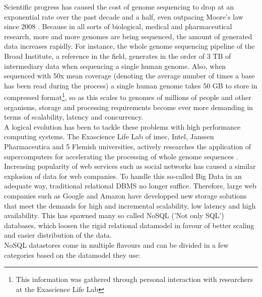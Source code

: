 \documentclass{IEEEtran}
\begin{document}
Scientific progress has caused the cost of genome sequencing to drop at an exponential rate over the past decade and a half, even outpacing Moore's law since 2008 \cite{wetterstrand_sequencing_cost}. Because in all sorts of biological, medical and pharmaceutical research, more and more genomes are being sequenced, the amount of generated data increases rapidly. For instance, the whole genome sequencing pipeline of the Broad Institute\cite{broad_institute}, a reference in the field, generates in the order of 3 TB of intermediary data when sequencing a single human genome. Also, when sequenced with 50x mean coverage (denoting the average number of times a base has been read during the process\cite{coverage_definition}) a single human genome takes 50 GB to store in compressed format\footnote{This information was gathered through personal interaction with researchers at the Exascience Life Lab}, so as this scales to genomes of millions of people and other organisms, storage and processing requirements become ever more demanding in terms of scalability, latency and concurrency.
\\A logical evolution has been to tackle these problems with high performance computing systems. The Exascience Life Lab of imec, Intel, Janssen Pharmaceutica and 5 Flemish universities, actively researches the application of supercomputers for accelerating the processing of whole genome sequences \cite{exascience_life_lab}\cite{lifelab_BWA}.
\\Increasing popularity of web services such as social networks has caused a similar explosion of data for web companies. To handle this so-called Big Data\cite{mashey1997big} in an adequate way, traditional relational DBMS no longer suffice. Therefore, large web companies such as Google and Amazon have developped new storage solutions that meet the demands for high and incremental scalability, low latency and high availability\cite{baker2011megastore}. This has spawned many so called NoSQL ('Not only SQL') databases, which loosen the rigid relational datamodel in favour of better scaling and easier distribution of the data.
\\NoSQL datastores come in multiple flavours and can be divided in a few categories based on the datamodel they use:
\end{document}
